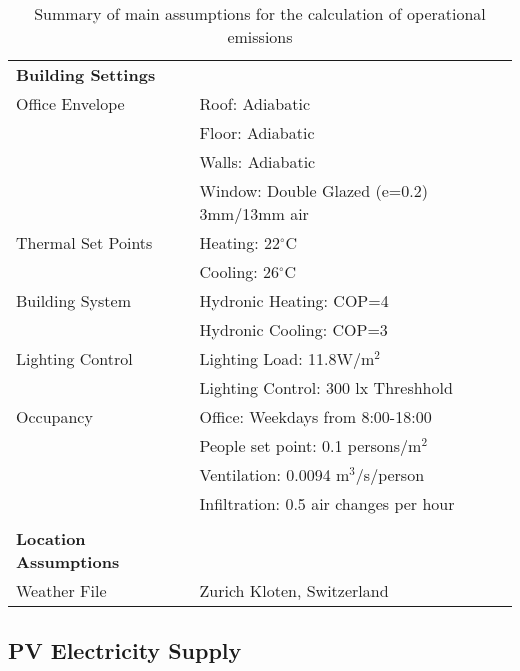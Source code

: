 \begin{table*}
\centering
\begin{tabular*}{\textwidth}{ll}
\hline
\textbf{Building Settings}    &                                                \\
Office Envelope               & Roof: Adiabatic                                \\
                              & Floor: Adiabatic                               \\
                              & Walls: Adiabatic                               \\
                              & Window: Double Glazed (e=0.2) 3mm/13mm air \\
Thermal Set Points            & Heating: 22$^{\circ}$C          \\
                              & Cooling: 26$^{\circ}$C          \\
Building System               & Hydronic Heating: COP=4                        \\
                              & Hydronic Cooling: COP=3                        \\
Lighting Control              & Lighting Load: 11.8W/m$^2$                                  \\
                              & Lighting Control: 300 lx Threshhold            \\
Occupancy                     & Office: Weekdays from 8:00-18:00               \\
                              & People set point: 0.1 persons/m$^2$               \\
							& Ventilation: 0.0094 m$^3$/s/person               \\
                              & Infiltration: 0.5 air changes per hour                     \\
                              &                                                \\
\textbf{Location Assumptions} &                                                \\
Weather File                  & Zurich Kloten, Switzerland                \\
\hline
\end{tabular*}
\caption{Summary of main assumptions for the calculation of operational emissions}
\label{tab:AssumptionsOpp}
\end{table*}

\subsection{PV Electricity Supply}

